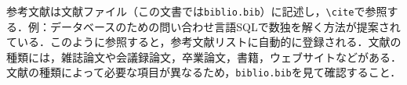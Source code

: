 参考文献は文献ファイル（この文書では\verb|biblio.bib|）に記述し，\verb|\cite|で参照する．例：データベースのための問い合わせ言語SQLで数独を解く方法が提案されている\cite{yabuki2011}．このように参照すると，参考文献リストに自動的に登録される．文献の種類には，雑誌論文\cite{yabuki2011}や会議録論文\cite{yabuki2013}，卒業論文\cite{kubo2014}，書籍\cite{okumura2013}，ウェブサイト\cite{self}などがある．文献の種類によって必要な項目が異なるため，\verb|biblio.bib|を見て確認すること．




